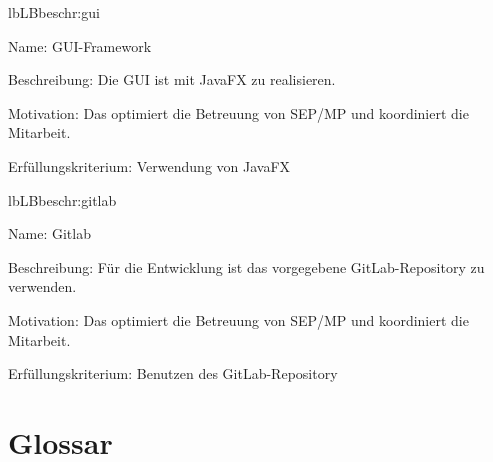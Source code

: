 \begin{description}[leftmargin=5em, style=sameline]
	\begin{lhp}{lb}{LB}{beschr:gui}
		\item [Name:] GUI-Framework
		\item [Beschreibung:] Die GUI ist mit JavaFX zu realisieren.
		\item [Motivation:] Das optimiert die Betreuung von SEP/MP und koordiniert die Mitarbeit.
		\item [Erfüllungskriterium:] Verwendung von JavaFX
	\end{lhp}
	
	\begin{lhp}{lb}{LB}{beschr:gitlab}
		\item [Name:] Gitlab
		\item [Beschreibung:] Für die Entwicklung ist das vorgegebene GitLab-Repository zu verwenden.
		\item [Motivation:] Das optimiert die Betreuung von SEP/MP und koordiniert die Mitarbeit.
		\item [Erfüllungskriterium:] Benutzen des GitLab-Repository
	\end{lhp}
	
	
\end{description}

\section{Glossar}

